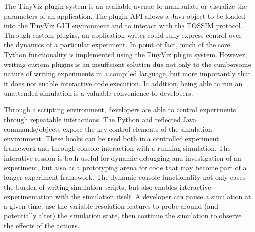 \documentclass[10pt]{article}
\newcommand{\name}{{Tython}\xspace}
\begin{document}
The TinyViz plugin system is an available avenue to manipulate or
visualize the parameters of an application. The plugin API allows a
Java object to be loaded into the TinyViz GUI environment and to
interact with the TOSSIM protocol. Through custom plugins, an
application writer could fully express control over the dynamics of a
particular experiment. In point of fact, much of the core \name
functionality is implemented using the TinyViz plugin system. However,
writing custom plugins is an insufficient solution due not only to the
cumbersome nature of writing experiments in a compiled language, but
more importantly that it does not enable interactive code execution.
In addition, being able to run an unattended simulation is a valuable
convenience to developers.

Through a scripting environment, developers are able to control
experiments through repeatable interactions. The Python and reflected
Java commands/objects expose the key control elements of the
simulation environment. These hooks can be used both in a controlled
experiment framework and through console interaction with a running
simulation. The interative session is both useful for dynamic
debugging and investigation of an experiment, but also as a
prototyping arena for code that may become part of a longer experiment
framework. The dynamic console functionality not only eases the burden
of writing simulation scripts, but also enables interactive
experimentation with the simulation itself. A developer can pause a
simulation at a given time, use the variable resolution features to
probe around (and potentially alter) the simulation state, then
continue the simulation to observe the effects of the actions.


\end{document}
